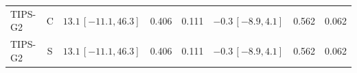 \begin{longtable}{lcp{37mm}rrp{37mm}rr}
TIPS-G2 & C & \(13.1\,[-11.1,46.3]\) & 0.406 & 0.111 & \(-0.3\,[-8.9,4.1]\) & 0.562 & 0.062\\
TIPS-G2 & S & \(13.1\,[-11.1,46.3]\) & 0.406 & 0.111 & \(-0.3\,[-8.9,4.1]\) & 0.562 & 0.062\\

\end{longtable}
